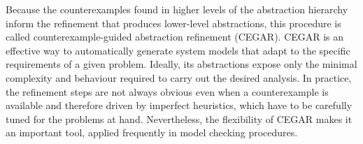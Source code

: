 Because the counterexamples found in higher levels of the abstraction hierarchy inform the refinement that produces lower-level abstractions, this procedure is called counterexample-guided abstraction refinement (CEGAR). %
CEGAR is an effective way to automatically generate system models that adapt to the specific requirements of a given problem.
Ideally, its abstractions expose only the minimal complexity and behaviour required to carry out the desired analysis.
In practice, the refinement steps are not always obvious even when a counterexample is available and therefore driven by imperfect heuristics, which have to be carefully tuned for the problems at hand.
Nevertheless, the flexibility of CEGAR makes it an important tool, applied frequently in model checking procedures.


